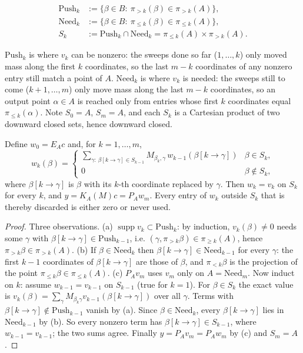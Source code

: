 \documentclass[11pt]{article}
\newcommand{\PA}{P_{\!A}}\newcommand{\EA}{E_{A}}\newcommand{\KA}{K_{\!A}}
\newcommand{\pr}[1]{\pi_{#1}}
\DeclareMathOperator{\supp}{supp}
\begin{document}
\begin{definition}
\begin{align*}
 \mathrm{Push}_k&:=\{\beta\in B:\ \pr{>k}(\beta)\in\pr{>k}(A)\},\\
 \mathrm{Need}_k&:=\{\beta\in B:\ \pr{\le k}(\beta)\in\pr{\le k}(A)\},\\
 S_k&:=\mathrm{Push}_k\cap\mathrm{Need}_k=\pr{\le k}(A)\times\pr{>k}(A).
\end{align*}
\end{definition}
$\mathrm{Push}_k$ is where $v_k$ can be nonzero: the sweeps done so far ($1,\dots,k$) only moved mass along the first $k$
coordinates, so the last $m-k$ coordinates of any nonzero entry still match a point of $A$. $\mathrm{Need}_k$ is
where $v_k$ is needed: the sweeps still to come ($k+1,\dots,m$) only move mass along the last $m-k$ coordinates,
so an output point $\alpha\in A$ is reached only from entries whose first $k$ coordinates equal $\pr{\le k}(\alpha)$.
Note $S_0=A$, $S_m=A$, and each $S_k$ is a Cartesian product of two downward closed sets, hence downward closed.

\begin{theorem}\label{thm:main}
Define $w_0=\EA c$ and, for $k=1,\dots,m$,
\[
 w_k(\beta)=\begin{cases}\displaystyle\sum_{\gamma:\ \beta[k\to\gamma]\in S_{k-1}} M_{\beta_k,\gamma}\,w_{k-1}(\beta[k\to\gamma]) & \beta\in S_k,\\[1ex] 0 & \beta\notin S_k,\end{cases}
\]
where $\beta[k\to\gamma]$ is $\beta$ with its $k$-th coordinate replaced by $\gamma$. Then $w_k=v_k$ on $S_k$ for every $k$, and
$y=\KA(M)c=\PA w_m$. Every entry of $w_k$ outside $S_k$ that is thereby discarded is either zero or never used.
\end{theorem}
\begin{proof}
Three observations. (a) $\supp v_k\subset\mathrm{Push}_k$: by induction, $v_k(\beta)\ne0$ needs some $\gamma$ with
$\beta[k\to\gamma]\in\mathrm{Push}_{k-1}$, i.e. $(\gamma,\pr{>k}\beta)\in\pr{\ge k}(A)$, hence $\pr{>k}\beta\in\pr{>k}(A)$.
(b) If $\beta\in\mathrm{Need}_k$ then $\beta[k\to\gamma]\in\mathrm{Need}_{k-1}$ for every $\gamma$: the first $k-1$ coordinates
of $\beta[k\to\gamma]$ are those of $\beta$, and $\pr{<k}\beta$ is the projection of the point $\pr{\le k}\beta\in\pr{\le k}(A)$.
(c) $\PA v_m$ uses $v_m$ only on $A=\mathrm{Need}_m$.
Now induct on $k$: assume $w_{k-1}=v_{k-1}$ on $S_{k-1}$ (true for $k=1$). For $\beta\in S_k$ the exact value is
$v_k(\beta)=\sum_{\gamma}M_{\beta_k\gamma}v_{k-1}(\beta[k\to\gamma])$ over all $\gamma$. Terms with $\beta[k\to\gamma]\notin\mathrm{Push}_{k-1}$
vanish by (a). Since $\beta\in\mathrm{Need}_k$, every $\beta[k\to\gamma]$ lies in $\mathrm{Need}_{k-1}$ by (b). So every nonzero term
has $\beta[k\to\gamma]\in S_{k-1}$, where $w_{k-1}=v_{k-1}$; the two sums agree. Finally $y=\PA v_m=\PA w_m$ by (c) and $S_m=A$.
\end{proof}
\end{document}
